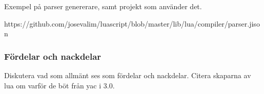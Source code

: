 Exempel på parser genererare, samt projekt som använder det.

https://github.com/josevalim/luascript/blob/master/lib/lua/compiler/parser.jison

\subsubsection{Fördelar och nackdelar}

Diskutera vad som allmänt ses som fördelar och nackdelar. Citera skaparna av
lua om varför de böt från yac i 3.0.

%
%
%


%
%

